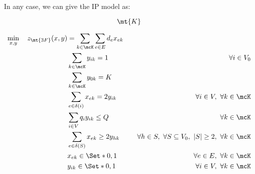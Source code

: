 In any case, we can give the IP model as:

$$
\mt{K}
$$

\begin{align}
	\min_{x, y} \quad z_\mt{3F}(x, y) & = \sum_{k \in \mcK} \sum_{e \in E} d_{e} x_{ek} \label{eq:three-index-flow-obj-func}                                                                                                                               \\
	                                  & \sum_{k \in \mcK} y_{ik} = 1                                                         & \quad \forall i \in V_0                                              \label{eq:three-index-flow-all-customers-visited}      \\
	                                  & \sum_{k \in \mcK} y_{0k} = K                                                         & \label{eq:three-index-flow-tour-starts-and-ends-at-depot}                                                                   \\
	                                  & \sum_{e \in \delta(i)} x_{ek} = 2 y_{ik}                                          & \quad \forall i \in V,\ \forall k \in \mcK \label{eq:three-index-flow-force-visited-customer-if-flow}                          \\
	                                  & \sum_{i \in V} q_i y_{ik} \le Q                                                   & \quad \forall k \in \mcK \label{eq:three-index-flow-force-resource-upper-bound}                                                \\
	                                  & \sum_{e \in \delta(S)} x_{ek} \ge 2 y_{hk}                                        & \quad \forall h \in S,\ \forall S \subseteq V_0,\ |S| \ge 2,\ \forall k \in \mcK \label{eq:three-index-flow-secv1} \\
	                                  & x_{ek}                   \in \Set*{0, 1}                                          & \quad \forall e \in E,\ \forall k \in \mcK             \label{eq:three-index-flow-x-mip-var-bounds}                            \\
	                                  & y_{ik}                    \in \Set*{0, 1}                                         & \quad \forall i \in V,\ \forall k \in \mcK  \label{eq:three-index-flow-y-mip-var-bounds}
\end{align}

